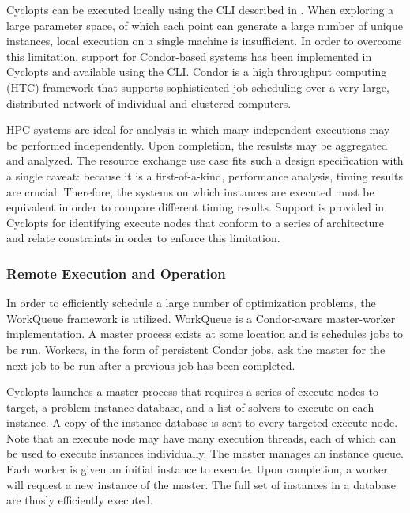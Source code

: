 Cyclopts can be executed locally using the  CLI described
in \label{method:tools:cli}. When exploring a large parameter space, of which
each point can generate a large number of unique instances, local execution on a
single machine is insufficient. In order to overcome this limitation, support
for Condor-based systems has been implemented in Cyclopts and available using
the  CLI. Condor \cite{condor-practice} is a high
throughput computing (HTC) framework that supports sophisticated job scheduling
over a very large, distributed network of individual and clustered computers.

HPC systems are ideal for analysis in which many independent executions may be
performed independently. Upon completion, the resulsts may be aggregated and
analyzed. The resource exchange use case fits such a design specification with a
single caveat: because it is a first-of-a-kind, performance analysis, timing
results are crucial. Therefore, the systems on which instances are executed must
be equivalent in order to compare different timing results. Support is provided
in Cyclopts for identifying execute nodes that conform to a series of
architecture and relate constraints in order to enforce this limitation.

\subsubsection{Remote Execution and Operation}

In order to efficiently schedule a large number of optimization problems, the
WorkQueue framework \cite{bui_work_2011} is utilized. WorkQueue is a
Condor-aware master-worker implementation. A master process exists at some
location and is schedules jobs to be run. Workers, in the form of persistent
Condor jobs, ask the master for the next job to be run after a previous job has
been completed.

Cyclopts launches a master process that requires a series of execute nodes to
target, a problem instance database, and a list of solvers to execute on each
instance. A copy of the instance database is sent to every targeted execute
node. Note that an execute node may have many execution threads, each of which
can be used to execute instances individually. The master manages an instance
queue. Each worker is given an initial instance to execute. Upon completion, a
worker will request a new instance of the master. The full set of instances in a
database are thusly efficiently executed.

